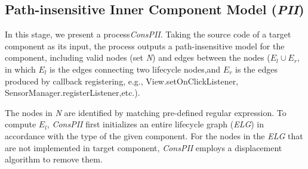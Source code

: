 
\subsection{Path-insensitive Inner Component Model (\textit{PII})}
In this stage, we present a process\textit{ConsPII}. Taking the source code of a target component as its input, the process 
outputs a path-insensitive model for the component, including valid nodes (set \textit{N}) and edges between the nodes ($E_{l} \cup E_{r}$, in which $E_l$ is the edges connecting two lifecycle nodes,and $E_r$ is the edges produced by callback registering, e.g., View.setOnClickListener, SensorManager.registerListener,etc.).

The nodes in \textit{N} are identified by matching pre-defined regular expression.
To compute $E_{l}$, \textit{ConsPII} first initializes an entire lifecycle graph (\textit{ELG}) in accordance with the type of the given component. 
For the nodes in the \textit{ELG} that are not implemented in target component, \textit{ConsPII} employs a displacement algorithm to remove them.

